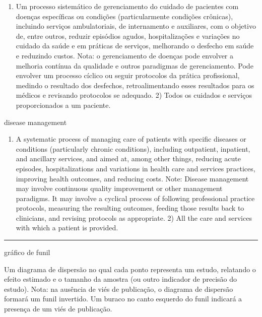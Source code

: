 \documentclass[
  openany]{book}
\providecommand{\tightlist}{%
  \setlength{\itemsep}{0pt}\setlength{\parskip}{0pt}}
\begin{document}
\begin{enumerate}
\def\labelenumi{\arabic{enumi})}
\tightlist
\item
  Um processo sistemático de gerenciamento do cuidado de pacientes com doenças específicas ou condições (particularmente condições crônicas), incluindo serviços ambulatoriais, de internamento e auxiliares, com o objetivo de, entre outros, reduzir episódios agudos, hospitalizações e variações no cuidado da saúde e em práticas de serviços, melhorando o desfecho em saúde e reduzindo custos. Nota: o gerenciamento de doenças pode envolver a melhoria contínua da qualidade e outros paradigmas de gerenciamento. Pode envolver um processo cíclico ou seguir protocolos da prática profissional, medindo o resultado dos desfechos, retroalimentando esses resultados para os médicos e revisando protocolos se adequado. 2) Todos os cuidados e serviços proporcionados a um paciente.
\end{enumerate}

disease management

\begin{enumerate}
\def\labelenumi{\arabic{enumi})}
\tightlist
\item
  A systematic process of managing care of patients with specific diseases or conditions (particularly chronic conditions), including outpatient, inpatient, and ancillary services, and aimed at, among other things, reducing acute episodes, hospitalizations and variations in health care and services practices, improving health outcomes, and reducing costs. Note: Disease management may involve continuous quality improvement or other management paradigms. It may involve a cyclical process of following professional practice protocols, measuring the resulting outcomes, feeding those results back to clinicians, and revising protocols as appropriate. 2) All the care and services with which a patient is provided.
\end{enumerate}

\begin{center}\rule{0.5\linewidth}{0.5pt}\end{center}

gráfico de funil

Um diagrama de dispersão no qual cada ponto representa um estudo, relatando o efeito estimado e o tamanho da amostra (ou outro indicador de precisão do estudo). Nota: na ausência de viés de publicação, o diagrama de dispersão formará um funil invertido. Um buraco no canto esquerdo do funil indicará a presença de um viés de publicação.
\end{document}
